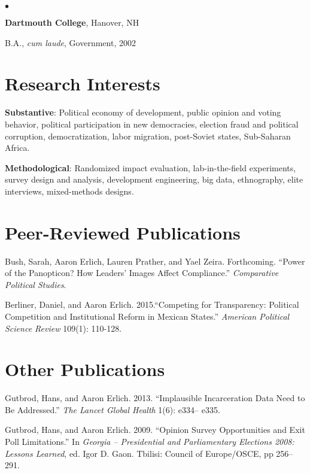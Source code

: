 \documentclass[margin,line]{res}
\newenvironment{list1}{
  \begin{list}{\ding{113}}{%
      \setlength{\itemsep}{0in}
      \setlength{\parsep}{0in} \setlength{\parskip}{0in}
      \setlength{\topsep}{0in} \setlength{\partopsep}{0in} 
      \setlength{\leftmargin}{0.17in}}}{\end{list}}
\newenvironment{list2}{
  \begin{list}{$\bullet$}{%
      \setlength{\itemsep}{0in}
      \setlength{\parsep}{0in} \setlength{\parskip}{0in}
      \setlength{\topsep}{0in} \setlength{\partopsep}{0in} 
      \setlength{\leftmargin}{0.2in}}}{\end{list}}
\begin{document}
{\begin{resume}
\begin{list1}
\begin{list2}
\end{list2}
\end{list1}

{\bf Dartmouth College}, Hanover, NH\\
\vspace*{-.1in}
\begin{list1}
\item[] B.A., \emph{cum laude}, Government,  2002
\end{list1}

\section{\sc Research Interests}
\textbf{Substantive}: Political economy of development, public opinion
and voting behavior, political participation in new
democracies, election fraud and
political corruption, democratization,  labor migration, post-Soviet states, Sub-Saharan Africa.

\textbf{Methodological}: Randomized impact evaluation,
lab-in-the-field experiments, survey design and analysis, development engineering, big data, ethnography, elite
interviews, mixed-methods designs.

\section{\sc Peer-Reviewed Publications}

Bush, Sarah, Aaron Erlich, Lauren Prather, and Yael
Zeira. Forthcoming. ``Power of the Panopticon? How Leaders' Images Affect Compliance.''
\emph{Comparative Political Studies}.

Berliner, Daniel,  and Aaron Erlich. 2015.``Competing for
Transparency: Political Competition and Institutional Reform in
Mexican States.'' \emph{American Political Science Review} 109(1): 110-128.

\section{\sc  Other Publications}
Gutbrod, Hans, and Aaron Erlich. 2013. ``Implausible Incarceration
Data Need to Be Addressed.'' \emph{The Lancet Global Health} 1(6):
e334-- e335.

Gutbrod, Hans, and Aaron Erlich. 2009. ``Opinion Survey Opportunities and Exit Poll
Limitations.'' In \emph{Georgia -- Presidential and Parliamentary
  Elections 2008: Lessons Learned}, ed. Igor D. Gaon. Tbilisi: Council
of Europe/OSCE, pp 256--291.
 

\end{resume}}
\end{document}
